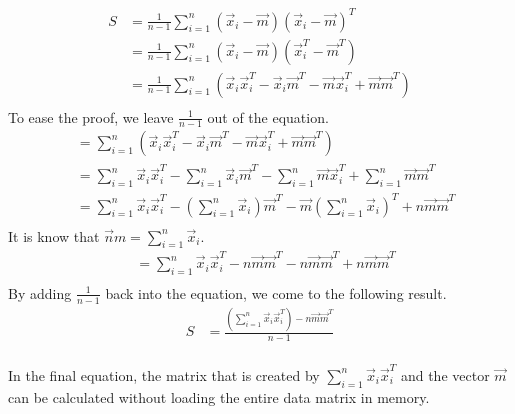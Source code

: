\documentclass[a4paper,12px]{article}
\begin{document}
\begin{equation}
\begin{aligned}
S &= \frac{1}{n-1} \sum\limits_{i=1}^{n} (\vec x_i - \vec m)(\vec x_i - \vec m)^T\\
  &= \frac{1}{n-1} \sum\limits_{i=1}^{n} (\vec x_i - \vec m)(\vec x_i^T - \vec m^T)\\
  &= \frac{1}{n-1} \sum\limits^n_{i=1} \left(\vec x_i \vec x_i^T - \vec x_i \vec m^T -
                                             \vec m \vec x_i^T + \vec m \vec m ^T\right) \\
\end{aligned}
\end{equation}
To ease the proof, we leave $\frac{1}{n-1}$ out of the equation.
\begin{equation}
\begin{aligned}
  &= \sum\limits^n_{i=1} \left(\vec x_i \vec x_i^T - \vec x_i \vec m^T - \vec m \vec
    x_i^T + \vec m \vec m^T\right)\\
  &= \sum\limits^n_{i=1} \vec x_i \vec x_i^T - \sum\limits^n_{i=1} \vec x_i \vec m^T - \sum\limits^n_{i=1} \vec m \vec
    x_i^T + \sum\limits^n_{i=1} \vec m \vec m^T \\
  &= \sum\limits^n_{i=1} \vec x_i \vec x_i^T - \left(\sum\limits^n_{i=1} \vec x_i\right)
    \vec m^T - \vec m \left(\sum\limits^n_{i=1} \vec x_i\right)^T + n \vec m \vec m^T\\
\end{aligned}
\end{equation}
It is know that $\vec nm = \sum\limits_{i=1}^n \vec x_i$.
\begin{equation}
\begin{aligned}
    &= \sum\limits^n_{i=1} \vec x_i \vec x_i^T - n \vec m \vec m^T - n \vec m \vec
    m^T + n \vec m \vec m^T \\
\end{aligned}
\end{equation}
By adding $\frac{1}{n-1}$ back into the equation, we come to the following result.
\begin{equation}
\begin{aligned}
    S &= \frac{\left(\sum\limits^n_{i=1} \vec x_i \vec x_i^T \right) - n \vec m \vec m^T}{n-1} \\
\end{aligned}
\end{equation}

In the final equation, the matrix that is created by $\sum\limits_{i=1}^n \vec
x_i \vec x_i^T$ and the vector $\vec m$ can be calculated without loading the
entire data matrix in memory.



% 
% 
\end{document}
